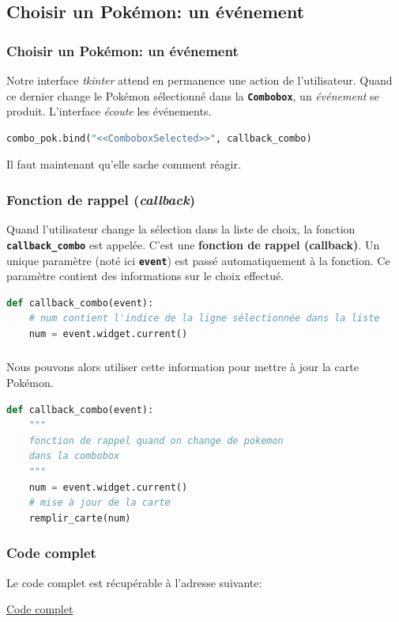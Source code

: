 \documentclass[svgnames,11pt]{beamer}
\begin{document}
\subsection{Choisir un Pokémon: un événement}
\begin{frame}[fragile]
    \frametitle{Choisir un Pokémon: un événement}

    Notre interface \emph{tkinter} attend en permanence une action de l'utilisateur. Quand ce dernier change le Pokémon sélectionné dans la \textbf{\texttt{Combobox}}, un \emph{événement} se produit. L'interface \emph{écoute} les événements.

    \begin{center}
    \begin{lstlisting}[language=Python,basicstyle=\small,xleftmargin=0.3em,xrightmargin=0.3em]
combo_pok.bind("<<ComboboxSelected>>", callback_combo)
\end{lstlisting}
    \label{CODE}
    \end{center}
Il faut maintenant qu'elle sache comment réagir.
\end{frame}
\begin{frame}[fragile]
    \frametitle{Fonction de rappel (\emph{callback})}

Quand l'utilisateur change la sélection dans la liste de choix, la fonction \textbf{\texttt{callback\_combo}} est appelée. C'est une \textbf{fonction de rappel (callback)}. Un unique paramètre (noté ici \textbf{\texttt{event}}) est passé automatiquement à la fonction. Ce paramètre contient des informations sur le choix effectué.
\begin{center}
\begin{lstlisting}[language=Python,basicstyle=\small]
def callback_combo(event):
    # num contient l'indice de la ligne sélectionnée dans la liste
    num = event.widget.current()
\end{lstlisting}
\label{CODE}
\end{center}
\end{frame}
\begin{frame}[fragile]
    \frametitle{}

Nous pouvons alors utiliser cette information pour mettre à jour la carte Pokémon.

\begin{center}
\begin{lstlisting}[language=Python, basicstyle=\small]
def callback_combo(event):
    """
    fonction de rappel quand on change de pokemon
    dans la combobox
    """
    num = event.widget.current()
    # mise à jour de la carte
    remplir_carte(num)
\end{lstlisting}
\end{center}

\end{frame}
\begin{frame}
    \frametitle{Code complet}

    Le code complet est récupérable à l'adresse suivante:
    \begin{center}
        \href{https://cviroulaud.github.io/premiere/donnees-table/pokemon/scripts/pokemon.py}{Code complet}
    \end{center}

\end{frame}
\end{document}
